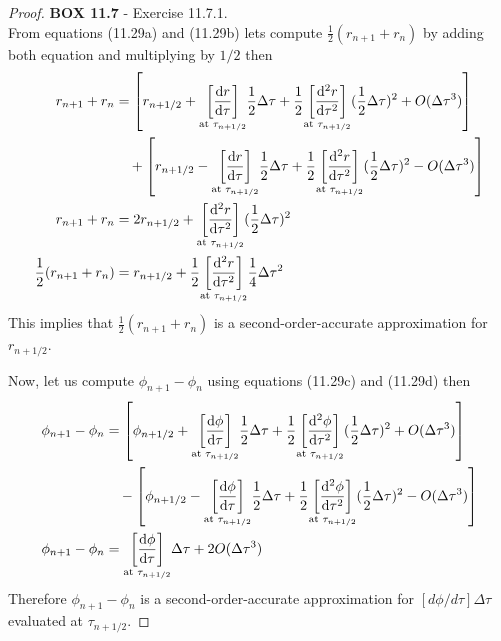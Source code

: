 \documentclass[11pt]{article}
\theoremstyle{definition}
\begin{document}
\begin{proof}{\textbf{BOX 11.7} - Exercise 11.7.1.}\\
    From equations (11.29a) and (11.29b) lets compute
    $\frac{1}{2}(r_{n+1} + r_n)$ by adding both equation and multiplying by
    $1/2$ then
    \begin{align*}
        r_{n+1} + r_n &= \left[r_{n+1/2}
        + \underset{\text{at }\tau_{n + 1/2}}{\left[\dv{r}{\tau}\right]}
        \frac{1}{2}\Delta\tau
        + \frac{1}{2}
        \underset{\text{at }\tau_{n + 1/2}}{\left[\dv[2]{r}{\tau}\right]}
        (\frac{1}{2}\Delta\tau)^2
        + O(\Delta\tau^3)
        \right]\\
        &\quad + \left[r_{n+1/2}
        - \underset{\text{at }\tau_{n + 1/2}}{\left[\dv{r}{\tau}\right]}
        \frac{1}{2}\Delta\tau
        + \frac{1}{2}
        \underset{\text{at }\tau_{n + 1/2}}{\left[\dv[2]{r}{\tau}\right]}
        (\frac{1}{2}\Delta\tau)^2
        - O(\Delta\tau^3)
        \right]\\
        r_{n+1} + r_n &= 2r_{n+1/2}
        + \underset{\text{at }\tau_{n + 1/2}}{\left[\dv[2]{r}{\tau}\right]}
        (\frac{1}{2}\Delta\tau)^2\\
        \frac{1}{2}(r_{n+1} + r_n) &= r_{n+1/2}
        + \frac{1}{2}
        \underset{\text{at }\tau_{n + 1/2}}{\left[\dv[2]{r}{\tau}\right]}
        \frac{1}{4}\Delta\tau^2
    \end{align*}
    This implies that $\frac{1}{2}(r_{n+1} + r_n)$ is a second-order-accurate
    approximation for $r_{n+1/2}$.

    Now, let us compute $\phi_{n+1} - \phi_n$ using equations (11.29c) and
    (11.29d) then
    \begin{align*}
        \phi_{n+1} - \phi_n &= \left[\phi_{n+1/2}
        + \underset{\text{at }\tau_{n + 1/2}}{\left[\dv{\phi}{\tau}\right]}
        \frac{1}{2}\Delta\tau
        + \frac{1}{2}
        \underset{\text{at }\tau_{n + 1/2}}{\left[\dv[2]{\phi}{\tau}\right]}
        (\frac{1}{2}\Delta\tau)^2
        + O(\Delta\tau^3)
        \right]\\
        &\quad - \left[\phi_{n+1/2}
        - \underset{\text{at }\tau_{n + 1/2}}{\left[\dv{\phi}{\tau}\right]}
        \frac{1}{2}\Delta\tau
        + \frac{1}{2}
        \underset{\text{at }\tau_{n + 1/2}}{\left[\dv[2]{\phi}{\tau}\right]}
        (\frac{1}{2}\Delta\tau)^2
        - O(\Delta\tau^3)
        \right]\\
        \phi_{n+1} - \phi_n &= 
        \underset{\text{at }\tau_{n + 1/2}}{\left[\dv{\phi}{\tau}\right]}
        \Delta\tau + 2O(\Delta\tau^3)
    \end{align*}
    Therefore $\phi_{n+1} - \phi_n$ is a second-order-accurate approximation
    for $[d\phi/d\tau]\Delta \tau$ evaluated at $\tau_{n+1/2}$.
\end{proof}
\end{document}
